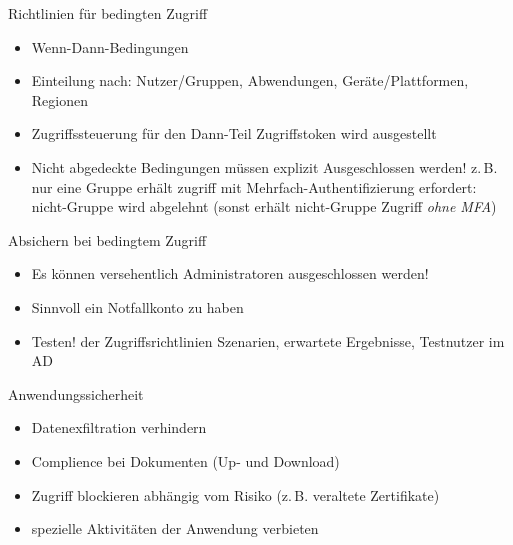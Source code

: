 \begin{flashcard}[Definition]{Richtlinien für bedingten Zugriff}
  \begin{itemize}
    \item Wenn-Dann-Bedingungen
    \item Einteilung nach:\newline
      Nutzer/Gruppen, Abwendungen, Geräte/Plattformen, Regionen
    \item Zugriffssteuerung für den Dann-Teil\newline
      Zugriffstoken wird ausgestellt
    \item Nicht abgedeckte Bedingungen müssen explizit Ausgeschlossen werden!\newline
      z.\,B. nur eine Gruppe erhält zugriff mit Mehrfach-Authentifizierung erfordert:\newline
      nicht-Gruppe wird abgelehnt (sonst erhält nicht-Gruppe Zugriff \emph{ohne MFA})
  \end{itemize}
\end{flashcard}

\begin{flashcard}[Definition]{Absichern bei bedingtem Zugriff}
  \begin{itemize}
    \item Es können versehentlich Administratoren ausgeschlossen werden!
    \item Sinnvoll ein Notfallkonto zu haben
    \item Testen! der Zugriffsrichtlinien\newline
      Szenarien, erwartete Ergebnisse, Testnutzer im AD
  \end{itemize}
\end{flashcard}

\begin{flashcard}[Definition]{Anwendungssicherheit}
  \begin{itemize}
    \item Datenexfiltration verhindern
    \item Complience bei Dokumenten (Up- und Download)
    \item Zugriff blockieren abhängig vom Risiko (z.\,B. veraltete Zertifikate)
    \item spezielle Aktivitäten der Anwendung verbieten
  \end{itemize}
\end{flashcard}

